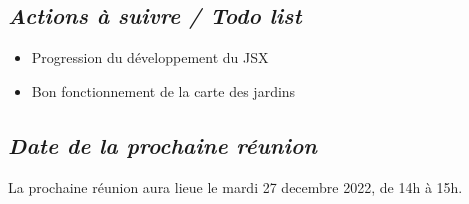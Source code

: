 \documentclass[french,a4paper]{article}
\begin{document}
\subsection*{\textit{Actions à suivre / Todo list}}
\begin{itemize}
  \item Progression du développement du JSX
  \item Bon fonctionnement de la carte des jardins
\end{itemize}

\subsection*{\textit{Date de la prochaine réunion}}
La prochaine réunion aura lieue le mardi 27 decembre 2022, de 14h à 15h.
\end{document}
